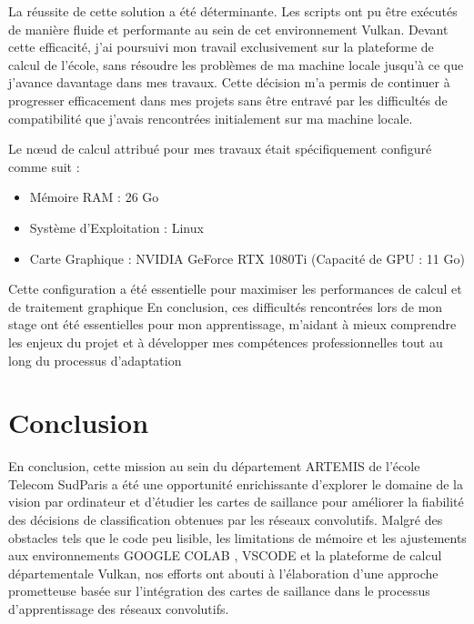 \documentclass{report}
\begin{document}
{    \hspace{1.6cm}La réussite de cette solution a été déterminante. Les scripts ont pu être exécutés de manière fluide et performante au sein de cet environnement Vulkan. Devant cette efficacité, j'ai poursuivi mon travail exclusivement sur la plateforme de calcul de l'école, sans résoudre les problèmes de ma machine locale jusqu'à ce que j'avance davantage dans mes travaux. Cette décision m'a permis de continuer à progresser efficacement dans mes projets sans être entravé par les difficultés de compatibilité que j'avais rencontrées initialement sur ma machine locale.

    Le nœud de calcul attribué pour mes travaux était spécifiquement configuré comme suit :
    \begin{itemize}
        \item Mémoire RAM : 26 Go
        \item Système d'Exploitation : Linux
        \item Carte Graphique : NVIDIA GeForce RTX 1080Ti (Capacité de GPU : 11 Go)
    \end{itemize}
    Cette configuration a été essentielle pour maximiser les performances de calcul et de traitement graphique
    \vspace*{0.5\baselineskip}
En conclusion, ces difficultés rencontrées lors de mon stage ont été essentielles pour
mon apprentissage, m’aidant à mieux comprendre les enjeux du projet et à développer
mes compétences professionnelles tout au long du processus d’adaptation
\chapter{Conclusion}
\hspace{1.6cm}En conclusion, cette mission au sein du département ARTEMIS de l'école Telecom SudParis a été une opportunité enrichissante d'explorer le domaine de la vision par ordinateur et d'étudier les cartes de saillance pour améliorer la fiabilité des décisions de classification obtenues par les réseaux convolutifs. Malgré des obstacles tels que le code peu lisible, les limitations de mémoire et les ajustements aux environnements GOOGLE COLAB \cite{google_colab}, VSCODE \cite{vscode} et la plateforme de calcul départementale Vulkan, nos efforts ont abouti à l'élaboration d'une approche prometteuse basée sur l'intégration des cartes de saillance dans le processus d'apprentissage des réseaux convolutifs.
\vspace*{0.5\baselineskip}

}
\end{document}
